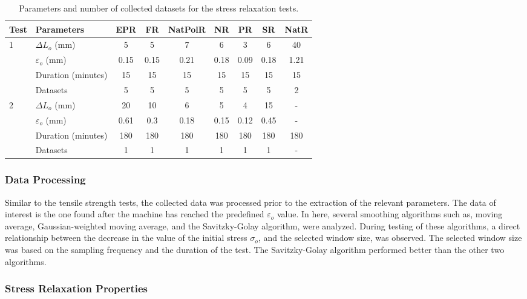 \begin{table*}[htbp!]
\centering
\caption{Parameters and number of collected datasets for the stress relaxation tests.}
\label{tbl:stressRelParameters}
\begin{tabular}{llccccccc} \toprule
Test & Parameters & EPR & FR & NatPolR & NR & PR & SR & NatR \\
\hline
\multirow{4}{*}{1}  & $\Delta L_o$ (mm)      & 5 & 5 & 7 & 6 & 3 & 6 & 40 \\
                    & $\varepsilon_o$ (mm)   & 0.15 & 0.15 & 0.21 & 0.18 & 0.09 & 0.18 & 1.21 \\
                    & Duration (minutes)    & 15 & 15 & 15 & 15 & 15 & 15 & 15 \\
                    & Datasets              & 5 & 5 & 5 & 5 & 5 & 5 & 2 \\
\hline 
\multirow{4}{*}{2}  & $\Delta L_o$ (mm)      & 20 & 10 & 6 & 5 & 4 & 15 & - \\
                    & $\varepsilon_o$ (mm)   & 0.61 & 0.3 & 0.18 & 0.15 & 0.12 & 0.45 & - \\
                    & Duration (minutes)    & 180 & 180 & 180 & 180 & 180 & 180 & 180 \\
                    & Datasets              & 1 & 1 & 1 & 1 & 1 & 1 & - \\
\bottomrule
\end{tabular}
\end{table*}

\subsubsection{Data Processing}

Similar to the tensile strength tests, the collected data was processed prior to the extraction of the relevant parameters. The data of interest is the one found after the machine has reached the predefined $\varepsilon_o$ value. In here, several smoothing algorithms such as, moving average, Gaussian-weighted moving average, and the Savitzky-Golay algorithm, were analyzed. During testing of these algorithms, a direct relationship between the decrease in the value of the initial stress $\sigma_o$, and the selected window size, was observed. The selected window size was based on the sampling frequency and the duration of the test. The Savitzky-Golay algorithm performed better than the other two algorithms.

\subsubsection{Stress Relaxation Properties}

